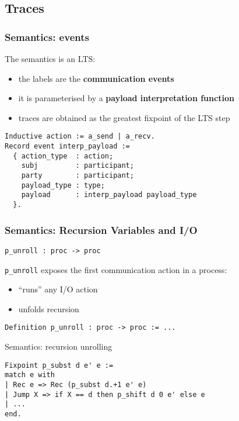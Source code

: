 \subsection{Traces}


\begin{frame}[fragile]
    \frametitle{Semantics: events}
    The semantics is an LTS: 
    \begin{itemize}
    \item the labels are the \textbf{communication events}
    \item it is parameterised by a \textbf{payload interpretation function}
    \item traces are obtained as the greatest fixpoint of the LTS step
    \end{itemize}
\vspace{.5cm}
    \begin{verbatim}
Inductive action := a_send | a_recv.
Record event interp_payload :=
  { action_type  : action;
    subj         : participant;
    party        : participant;
    payload_type : type;
    payload      : interp_payload payload_type
  }.
    \end{verbatim}
\end{frame}

\begin{frame}[fragile]
    \frametitle{Semantics: Recursion Variables and I/O}
    \verb|p_unroll : proc -> proc| 
\vspace{.2cm}

\verb|p_unroll| exposes the first communication action in a process:
\begin{itemize}
\item ``runs'' any I/O action
\item unfolds recursion
\end{itemize}
\vspace{1cm}
    \begin{verbatim}
Definition p_unroll : proc -> proc := ...
    \end{verbatim}
\end{frame}

\begin{frame}[fragile]{Semantics: recursion unrolling}
	\begin{verbatim}
Fixpoint p_subst d e' e :=
match e with
| Rec e => Rec (p_subst d.+1 e' e)
| Jump X => if X == d then p_shift d 0 e' else e
| ...
end.
	\end{verbatim}
\end{frame}

